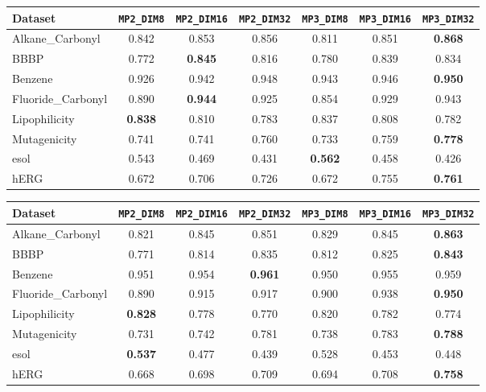 \begin{tabular}{lcccccc}
\hline
Dataset & \texttt{MP2\_DIM8} & \texttt{MP2\_DIM16} & \texttt{MP2\_DIM32} & \texttt{MP3\_DIM8} & \texttt{MP3\_DIM16} & \texttt{MP3\_DIM32} \\ \hline
Alkane_Carbonyl & 0.842 & 0.853 & 0.856 & 0.811 & 0.851 & \textbf{0.868} \\
BBBP & 0.772 & \textbf{0.845} & 0.816 & 0.780 & 0.839 & 0.834 \\
Benzene & 0.926 & 0.942 & 0.948 & 0.943 & 0.946 & \textbf{0.950} \\
Fluoride_Carbonyl & 0.890 & \textbf{0.944} & 0.925 & 0.854 & 0.929 & 0.943 \\
Lipophilicity & \textbf{0.838} & 0.810 & 0.783 & 0.837 & 0.808 & 0.782 \\
Mutagenicity & 0.741 & 0.741 & 0.760 & 0.733 & 0.759 & \textbf{0.778} \\
esol & 0.543 & 0.469 & 0.431 & \textbf{0.562} & 0.458 & 0.426 \\
hERG & 0.672 & 0.706 & 0.726 & 0.672 & 0.755 & \textbf{0.761} \\
\hline
\end{tabular}


\begin{tabular}{lcccccc}
\hline
Dataset & \texttt{MP2\_DIM8} & \texttt{MP2\_DIM16} & \texttt{MP2\_DIM32} & \texttt{MP3\_DIM8} & \texttt{MP3\_DIM16} & \texttt{MP3\_DIM32} \\ \hline
Alkane_Carbonyl & 0.821 & 0.845 & 0.851 & 0.829 & 0.845 & \textbf{0.863} \\
BBBP & 0.771 & 0.814 & 0.835 & 0.812 & 0.825 & \textbf{0.843} \\
Benzene & 0.951 & 0.954 & \textbf{0.961} & 0.950 & 0.955 & 0.959 \\
Fluoride_Carbonyl & 0.890 & 0.915 & 0.917 & 0.900 & 0.938 & \textbf{0.950} \\
Lipophilicity & \textbf{0.828} & 0.778 & 0.770 & 0.820 & 0.782 & 0.774 \\
Mutagenicity & 0.731 & 0.742 & 0.781 & 0.738 & 0.783 & \textbf{0.788} \\
esol & \textbf{0.537} & 0.477 & 0.439 & 0.528 & 0.453 & 0.448 \\
hERG & 0.668 & 0.698 & 0.709 & 0.694 & 0.708 & \textbf{0.758} \\
\hline
\end{tabular}


